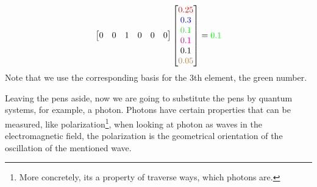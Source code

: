 $$
\begin{bmatrix}
	0 & 0 & 1 & 0 & 0 & 0\\
\end{bmatrix}
\begin{bmatrix}
	\textcolor{red}{0.25} \\
	\textcolor{blue}{0.3 }\\
	\textcolor{green}{0.1 }\\
	\textcolor{magenta}{0.1 }\\
	\textcolor{black}{0.1 }\\
	\textcolor{brown}{0.05}
\end{bmatrix} = \textcolor{green}{0.1 }
$$
Note that we use the corresponding basis for the 3th element, the green number.

Leaving the pens aside, now we are going to substitute the pens by quantum systems, for example, a photon. Photons have certain properties that can be measured, like polarization\footnote{More concretely, its a property of traverse ways, which photons are.}, when looking at photon as waves in the electromagnetic field, the polarization is the geometrical orientation of the oscillation of the mentioned wave.
